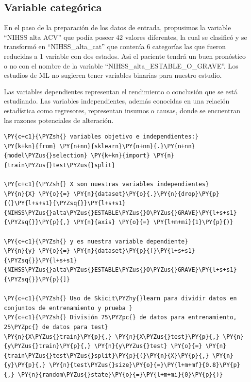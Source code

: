     \hypertarget{variable-categuxf3rica}{%
\subsection{Variable categórica}\label{variable-categuxf3rica}}

En el paso de la preparación de los datos de entrada, propusimos la
variable ``NIHSS alta ACV'' que podía poseer 42 valores diferentes, la
cual se clasificó y se transformó en ``NIHSS\_alta\_cat'' que contenía 6
categorías las que fueron reducidas a 1 variable con dos estados. Asi el
paciente tendrá un buen pronóstico o no con el nombre de la variable
``NIHSS\_alta\_ESTABLE\_O\_GRAVE''. Los estudios de ML no
sugieren tener variables binarias para nuestro estudio.

Las variables dependientes representan el rendimiento o conclusión que
se está estudiando. Las variables independientes, además conocidas en
una relación estadística como regresores, representan insumos o causas,
donde se encuentran las razones potenciales de alteración.

    \begin{tcolorbox}[breakable, size=fbox, boxrule=1pt, pad at break*=1mm,colback=cellbackground, colframe=cellborder]
\begin{Verbatim}[commandchars=\\\{\}]
\PY{c+c1}{\PYZsh{} variables objetivo e independientes:}
\PY{k+kn}{from} \PY{n+nn}{sklearn}\PY{n+nn}{.}\PY{n+nn}{model\PYZus{}selection} \PY{k+kn}{import} \PY{n}{train\PYZus{}test\PYZus{}split}

\PY{c+c1}{\PYZsh{} X son nuestras variables independientes}
\PY{n}{X} \PY{o}{=} \PY{n}{dataset}\PY{o}{.}\PY{n}{drop}\PY{p}{(}\PY{l+s+s1}{\PYZsq{}}\PY{l+s+s1}{NIHSS\PYZus{}alta\PYZus{}ESTABLE\PYZus{}O\PYZus{}GRAVE}\PY{l+s+s1}{\PYZsq{}}\PY{p}{,} \PY{n}{axis} \PY{o}{=} \PY{l+m+mi}{1}\PY{p}{)}

\PY{c+c1}{\PYZsh{} y es nuestra variable dependiente}
\PY{n}{y} \PY{o}{=} \PY{n}{dataset}\PY{p}{[}\PY{l+s+s1}{\PYZsq{}}\PY{l+s+s1}{NIHSS\PYZus{}alta\PYZus{}ESTABLE\PYZus{}O\PYZus{}GRAVE}\PY{l+s+s1}{\PYZsq{}}\PY{p}{]}

\PY{c+c1}{\PYZsh{} Uso de Skicit\PYZhy{}learn para dividir datos en conjuntos de entrenamiento y prueba }
\PY{c+c1}{\PYZsh{} División 75\PYZpc{} de datos para entrenamiento, 25\PYZpc{} de datos para test}
\PY{n}{X\PYZus{}train}\PY{p}{,} \PY{n}{X\PYZus{}test}\PY{p}{,} \PY{n}{y\PYZus{}train}\PY{p}{,} \PY{n}{y\PYZus{}test} \PY{o}{=} \PY{n}{train\PYZus{}test\PYZus{}split}\PY{p}{(}\PY{n}{X}\PY{p}{,} \PY{n}{y}\PY{p}{,} \PY{n}{test\PYZus{}size}\PY{o}{=}\PY{l+m+mf}{0.8}\PY{p}{,} \PY{n}{random\PYZus{}state}\PY{o}{=}\PY{l+m+mi}{0}\PY{p}{)}
\end{Verbatim}
\end{tcolorbox}

